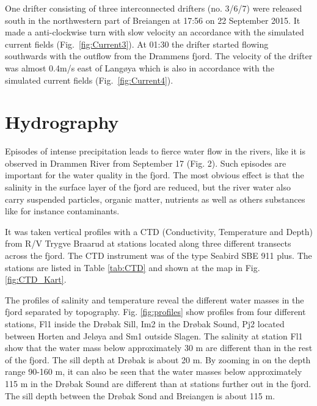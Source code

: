 \documentclass[12pt,a4paper,english]{article}
\begin{document}
One drifter consisting of three interconnected drifters (no. 3/6/7) were released south in the northwestern part of Breiangen at 17:56 on 22 September 2015. It made a anti-clockwise turn with slow velocity an accordance with the simulated current fields (Fig.~\ref{fig:Current3}). At 01:30 the drifter started flowing southwards with the outflow from the Drammens fjord. The velocity of the drifter was almost 0.4m/s east of Lang\o ya which is also in accordance with the simulated current fields (Fig.~\ref{fig:Current4}).   

\clearpage

%
%
%

\section{Hydrography}
Episodes of intense precipitation leads to fierce water flow in the rivers, 
like it is observed in Drammen River from September 17 (Fig. 2). %
Such episodes are important for the water quality in the fjord. 
The most obvious effect is that the salinity in the surface layer of the fjord 
are reduced, but the river water also carry suspended particles, organic matter, 
nutrients as well as others substances like for instance contaminants.       

It was taken vertical profiles with a CTD (Conductivity, Temperature and Depth)
from R/V Trygve Braarud 
at stations located along three different transects across the fjord. 
The CTD instrument was of the type Seabird SBE 911 plus.
The stations are listed in Table \ref{tab:CTD} and shown at the map in 
Fig. \ref{fig:CTD_Kart}. 

The profiles of salinity and temperature reveal the different water masses in 
the fjord separated by topography. Fig. \ref{fig:profiles} show profiles from 
four different stations, Fl1 inside the Dr{\o}bak Sill, Im2 in the Dr{\o}bak Sound, 
Pj2 located between Horten and Jel{\o}ya and Sm1 outside Slagen. 
The salinity at station Fl1 show that the water mass below approximately 30 m 
are different than in the rest of the fjord. 
The sill depth at Dr{\o}bak is about 20 m. 
By zooming in on the depth range 90-160 m, it can also be seen that the water 
masses below approximately 115 m in the Dr{\o}bak Sound are different than at 
stations further out in the fjord. The sill depth between the Dr{\o}bak Sond and 
Breiangen is about 115 m. 
\end{document}
